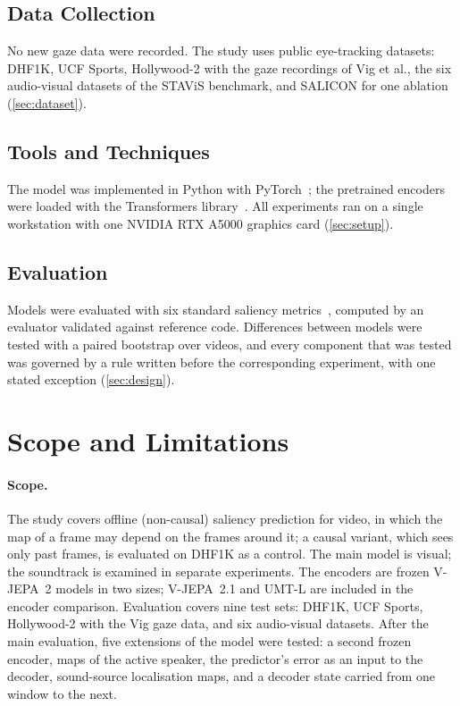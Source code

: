 \subsection{Data Collection}
No new gaze data were recorded. The study uses public eye-tracking datasets:
DHF1K, UCF Sports, Hollywood-2 with the gaze recordings of Vig et al., the six
audio-visual datasets of the STAViS benchmark, and SALICON for one ablation
(\cref{sec:dataset}).

\subsection{Tools and Techniques}
The model was implemented in Python with PyTorch~\cite{paszke2019pytorch}; the
pretrained encoders were loaded with the Transformers
library~\cite{wolf2020transformers}. All experiments ran on a single
workstation with one NVIDIA RTX A5000 graphics card (\cref{sec:setup}).

\subsection{Evaluation}
Models were evaluated with six standard saliency metrics~\cite{bylinskii2019metrics},
computed by an evaluator validated against reference code. Differences between
models were tested with a paired bootstrap over videos, and every component
that was tested was governed by a rule written before the corresponding
experiment, with one stated exception (\cref{sec:design}).

\section{Scope and Limitations}\label{sec:scope}


\paragraph{Scope.} The study covers offline (non-causal) saliency prediction for
video, in which the map of a frame may depend on the frames around it; a causal
variant, which sees only past frames, is evaluated on DHF1K as a control. The main
model is visual; the soundtrack is examined in separate experiments. The
encoders are frozen \acrshort{V-JEPA}~2 models in two sizes; \acrshort{V-JEPA}~2.1 and \acrshort{UMT}-L are
included in the encoder comparison. Evaluation covers nine test sets: DHF1K,
UCF Sports, Hollywood-2 with the Vig gaze data, and six audio-visual datasets.
After the main evaluation, five extensions of the model were tested: a second
frozen encoder, maps of the active speaker, the predictor's error as an input
to the decoder, sound-source localisation maps, and a decoder state carried
from one window to the next.

